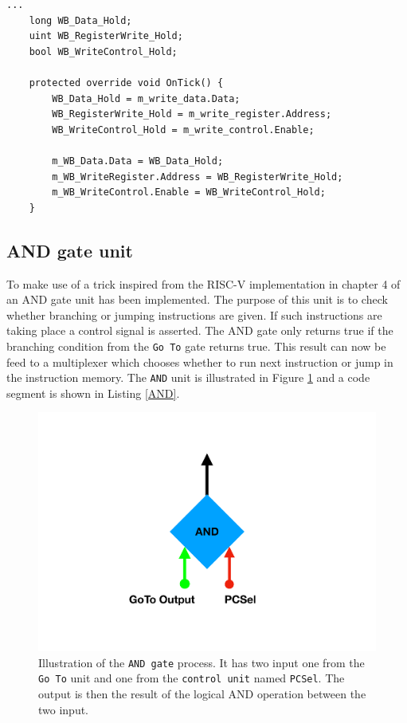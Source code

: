         \begin{minipage}{\linewidth}
            \begin{lstlisting}[language={[Sharp]C}, caption={A slice of the \texttt{Write Back} process SME code. It contains 3 variables, which will hold the incomming values, which gets outputted unchanged in the same clock cycle.},captionpos=b, label = WB]
...
    long WB_Data_Hold;
    uint WB_RegisterWrite_Hold;
    bool WB_WriteControl_Hold;
    
    protected override void OnTick() {
        WB_Data_Hold = m_write_data.Data;
        WB_RegisterWrite_Hold = m_write_register.Address;
        WB_WriteControl_Hold = m_write_control.Enable;
    
        m_WB_Data.Data = WB_Data_Hold;
        m_WB_WriteRegister.Address = WB_RegisterWrite_Hold;
        m_WB_WriteControl.Enable = WB_WriteControl_Hold;
    }
            \end{lstlisting}
        \end{minipage} 
    
    \subsection{AND gate unit}
        To make use of a trick inspired from the RISC-V implementation in chapter 4 of \cite{riscVbook} an AND gate unit has been implemented. The purpose of this unit is to check whether branching or jumping instructions are given. If such instructions are taking place a control signal is asserted. The AND gate only returns true if the branching condition from the \texttt{Go To} gate returns true. This result can now be feed to a multiplexer which chooses whether to run next instruction or jump in the instruction memory. The \texttt{AND} unit is illustrated in Figure \ref{fig:AND} and a code segment is shown in Listing \ref{AND}.
        
        \begin{figure}[h!]
            \centering
            \includegraphics[scale=0.35]{pictures/AND.pdf}
            \caption{Illustration of the \texttt{AND gate} process. It has two input one from the \texttt{Go To} unit and one from the \texttt{control unit} named \texttt{PCSel}. The output is then the result of the logical AND operation between the two input.}
            \label{fig:AND}
        \end{figure}
    
